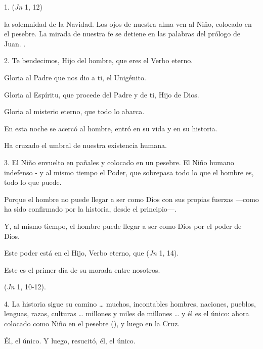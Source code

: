 \begin{body}
	1.  (\emph{Jn} 1, 12)
	
	 la solemnidad de la Navidad. Los ojos de nuestra alma ven al Niño, colocado en el pesebre. La mirada de nuestra fe se detiene en las palabras del prólogo de Juan. .
	
	2. Te bendecimos, Hijo del hombre, que eres el Verbo eterno.
	
	Gloria al Padre que nos dio a ti, el Unigénito.
	
	Gloria al Espíritu, que procede del Padre y de ti, Hijo de Dios.
	
	Gloria al misterio eterno, que todo lo abarca.
	
	En esta noche se acercó al hombre, entró en su vida y en su historia.
	
	Ha cruzado el umbral de nuestra existencia humana.
	
	3. El Niño envuelto en pañales y colocado en un pesebre. El Niño humano indefenso - y al mismo tiempo el Poder, que sobrepasa todo lo que el hombre es, todo lo que puede.
	
	Porque el hombre no puede llegar a ser como Dios con sus propias fuerzas ---como ha sido confirmado por la historia, desde el principio---.
	
	Y, al mismo tiempo, el hombre puede llegar a ser como Dios por el poder de Dios.
	
	Este poder está en el Hijo, Verbo eterno, que  (\emph{Jn} 1, 14).
	
	Este es el primer día de su morada entre nosotros.
	
	 (\emph{Jn} 1, 10-12).
	
	4. La historia sigue su camino \ldots{} muchos, incontables hombres, naciones, pueblos, lenguas, razas, culturas \ldots{} millones y miles de millones \ldots{} y él es el único: ahora colocado como Niño en el pesebre (), y luego en la Cruz.
	
	Él, el único. Y luego, resucitó, él, el único.
	

\end{body}
